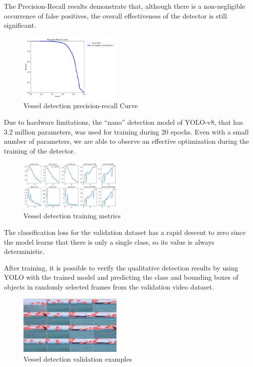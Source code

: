 \documentclass[a4paper,12pt]{article}
\begin{document}
\begin{multicols}{2}
The Precision-Recall results demonstrate that, although there is a non-negligible occurrence of false positives, the overall effectiveness of the detector is still significant.

\begin{figure}[H]
    \centering
    \includegraphics[width=0.45\textwidth]{images/detection/PR_curve}
    \caption{Vessel detection precision-recall Curve}
    \label{fig:1}
\end{figure}

Due to hardware limitations, the ``nano'' detection model of YOLO-v8, that has 3.2 million parameters, was used for training during 20 epochs.
Even with a small number of parameters, we are able to observe an effective optimization during the training of the detector.

\begin{figure}[H]
    \centering
    \includegraphics[width=0.45\textwidth]{images/detection/detection_results}
    \caption{Vessel detection training metrics}
    \label{fig:2}
\end{figure}

The classification loss for the validation dataset has a rapid descent to zero since the model learns that there is only a single class, so its value is always deterministic.

After training, it is possible to verify the qualitative detection results by using YOLO with the trained model and predicting the class and bounding boxes of objects in randomly selected frames from the validation video dataset.

\begin{figure}[H]
    \centering
    \includegraphics[width=0.45\textwidth]{images/detection/validation_labels}
    \caption{Vessel detection validation examples}
    \label{fig:3}
\end{figure}


\end{multicols}
\end{document}
